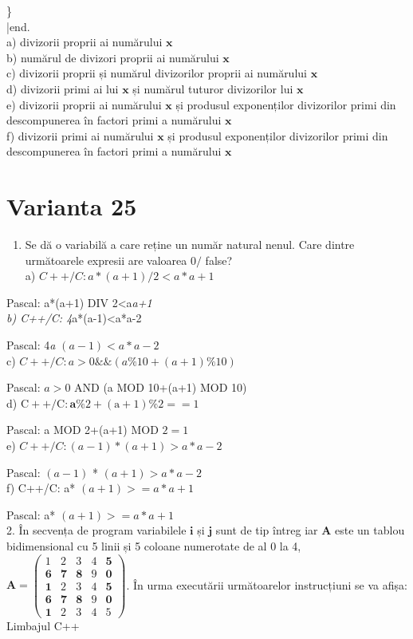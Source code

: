 \}\\
|end.\\
a) divizorii proprii ai numărului $\mathbf{x}$\\
b) numărul de divizori proprii ai numărului $\mathbf{x}$\\
c) divizorii proprii și numărul divizorilor proprii ai numărului $\mathbf{x}$\\
d) divizorii primi ai lui $\mathbf{x}$ și numărul tuturor divizorilor lui $\mathbf{x}$\\
e) divizorii proprii ai numărului $\mathbf{x}$ și produsul exponenților divizorilor primi din descompunerea în factori primi a numărului $\mathbf{x}$\\
f) divizorii primi ai numărului $\mathbf{x}$ și produsul exponenților divizorilor primi din descompunerea în factori primi a numărului $\mathbf{x}$

\section*{Varianta 25}
\begin{enumerate}
  \item Se dă o variabilă a care reține un număr natural nenul. Care dintre următoarele expresii are valoarea $0 /$ false?\\
a) $C++/ C: a *(a+1) / 2<a * a+1$
\end{enumerate}

Pascal: a*(a+1) DIV 2<a\textit{a+1\\
b) C++/C: 4}a*(a-1)<a*a-2

Pascal: 4\textit{a} $(a-1)<a * a-2$\\
c) $C++/ C: a>0 \& \&(a \% 10+(a+1) \% 10)$

Pascal: $a>0$ AND (a MOD 10+(a+1) MOD 10)\\
d) $\mathrm{C}++/ \mathrm{C}: \mathbf{a} \% 2+(\mathrm{a}+1) \% 2==1$

Pascal: a MOD 2+(a+1) MOD $2=1$\\
e) $C++/ C:(a-1) *(a+1)>a * a-2$

Pascal: $(a-1)$ * $(a+1)>a * a-2$\\
f) C++/C: a* $(a+1)>=a * a+1$

Pascal: a* $(a+1)>=a * a+1$\\
2. În secvența de program variabilele $\mathbf{i}$ și $\mathbf{j}$ sunt de tip întreg iar $\mathbf{A}$ este un tablou bidimensional cu 5 linii și 5 coloane numerotate de al 0 la 4,\\
$\boldsymbol{A}=\left(\begin{array}{lllll}1 & 2 & 3 & 4 & \mathbf{5} \\ \mathbf{6} & \mathbf{7} & \mathbf{8} & 9 & \mathbf{0} \\ \mathbf{1} & 2 & 3 & 4 & \mathbf{5} \\ \mathbf{6} & \mathbf{7} & \mathbf{8} & 9 & \mathbf{0} \\ \mathbf{1} & 2 & 3 & 4 & 5\end{array}\right)$. În urma executării următoarelor instrucțiuni se va afiṣa:\\
Limbajul C++

